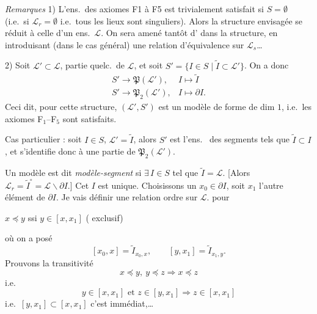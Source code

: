 \documentclass[11pt,a4paper]{article}
\begin{document}
\emph{Remarques} 1) L'ens.\ des axiomes F1 à F5 est trivialement satisfait si $S = \emptyset$ (i.e.\ si $\mathcal{L}_r = \emptyset$ i.e.\ tous les lieux sont singuliers). Alors la structure envisagée se réduit à celle d'un ens.\ $\mathcal{L}$. On sera amené tantôt d'\ill{} dans la structure, en introduisant (dans le cas général) une relation d'équivalence sur $\mathcal{L}_s$\ldots

2) Soit $\mathcal{L}' \subset \mathcal{L}$, partie quelc.\ de $\mathcal{L}$, et soit $S' = \lbrace I \in S \mid \widetilde{I} \subset \mathcal{L}' \rbrace$. On a donc
\[
  \begin{array}{ll}
    S' \to \mathfrak{P}(\mathcal{L}'), & I \mapsto \widetilde{I} \\
    S' \to \mathfrak{P}_2(\mathcal{L}'), & I \mapsto \partial I .
  \end{array}
\]
Ceci dit, pour cette structure, $(\mathcal{L}', S')$ est un modèle de forme de dim $1$, i.e.\ les axiomes F$_1$--F$_5$ sont satisfaits.

Cas particulier : soit $I \in S$, $\mathcal{L}' = \widetilde{I}$, alors $S'$ est l'ens.\  des segments tels que $\widetilde{I} \subset I$, et s'identifie donc à une partie de $\mathfrak{P}_2(\mathcal{L}')$.

Un modèle est dit \emph{modèle-segment} si $\exists\, I \in S$ tel que $\widetilde{I} = \mathcal{L}$.  [Alors $\mathcal{L}_r = \widetilde{I}^{\circ} = \mathcal{L} \smallsetminus \partial I$.] \struck{\ill{}} Cet $I$ est unique. Choisissons un $x_0 \in \partial I$, soit $x_1$ l'autre élément de $\partial I$. Je vais définir une relation ordre sur $\mathcal{L}$.  \struck{\ill{}} pour

 $x \preccurlyeq y$ ssi  $y \in [x,x_1]$ ( exclusif)

où on a posé
\[
  [x_0,x] = \widetilde{I}_{x_0,x}, \qquad [y,x_1] = \widetilde{I}_{x_1,y}.
\]
Prouvons la transitivité
\[
  x \preccurlyeq y,\ y \preccurlyeq z \Longrightarrow x \preccurlyeq z
\]
 i.e.
\[
  y \in [x,x_1] \text{ et } z \in [y,x_1] \Longrightarrow z \in [x,x_1]
\]
i.e.\ $[y,x_1] \subset [x,x_1]$ c'est immédiat,\ldots
{}
\end{document}
